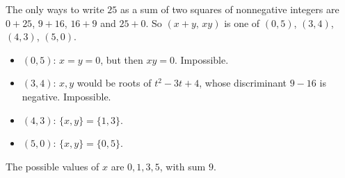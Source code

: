 The only ways to write $25$ as a sum of two squares of nonnegative integers are $0+25$, $9+16$, $16+9$ and $25+0$. So $(x+y,\,xy)$ is one of $(0,5)$, $(3,4)$, $(4,3)$, $(5,0)$.
\begin{itemize}
\item $(0,5)$: $x=y=0$, but then $xy=0$. Impossible.
\item $(3,4)$: $x,y$ would be roots of $t^2-3t+4$, whose discriminant $9-16$ is negative. Impossible.
\item $(4,3)$: $\{x,y\}=\{1,3\}$.
\item $(5,0)$: $\{x,y\}=\{0,5\}$.
\end{itemize}
The possible values of $x$ are $0,1,3,5$, with sum $\boxed{9}$.
